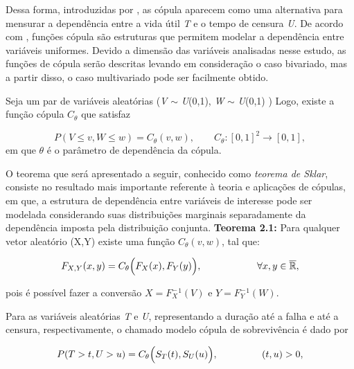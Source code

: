 \documentclass[11pt, a4paper]{article}
\begin{document}
\vspace{0,2cm}
Dessa forma, introduzidas por , as cópula aparecem como uma alternativa para mensurar a dependência entre a vida útil \textit{T} e o tempo de censura \textit{U}. De acordo com , funções cópula são estruturas que permitem modelar a dependência entre variáveis uniformes. Devido a dimensão das variáveis analisadas nesse estudo, as funções de cópula serão
descritas levando em consideração o caso bivariado, mas a partir disso, o caso multivariado pode ser facilmente obtido.

Seja um par de variáveis aleatórias \Big(\textit{V} $\sim$ \textit{U}(0,1),  \textit{W} $\sim$ \textit{U}(0,1) \Big) Logo, existe a função cópula $C_{\theta}$ que satisfaz

\begin{equation*}
P(V \le v, W \le w) = C_{\theta}(v,w),\quad\quad C_{\theta} : [0,1]^2 \rightarrow [0,1],
\end{equation*}
em que $\theta$ é o parâmetro de dependência da cópula.


O teorema que será apresentado a seguir, conhecido como \textit{teorema de Sklar}, consiste no resultado mais importante referente à teoria e aplicações de cópulas, em que, a estrutura de dependência entre variáveis de interesse pode ser modelada considerando suas distribuições marginais separadamente da dependência imposta pela distribuição conjunta.
\newpage
\noindent\textbf{Teorema 2.1:} Para qualquer vetor aleatório (X,Y) existe uma função $C_{\theta}(v,w)$, tal que:



\begin{equation*}
F_{X,Y}(x,y)=C_{\theta} \Big( F_{X}(x), F_{Y}(y) \Big), \hspace{20mm} \forall x,y \in\overline{\mathbb{R}},
\end{equation*}

\noindent pois é possível fazer a conversão $X = F_X^{-}^{1}(V)$ e $Y = F_Y^{-}^{1}(W)$.

Para as variáveis aleatórias \textit{T} e \textit{U}, representando a duração até a falha e até a censura,
respectivamente, o chamado modelo cópula de sobrevivência é dado por

\begin{equation*}
P(T > t,U > u) = C_\theta\Big(S_T(t), S_U(u)\Big),\hspace{16mm}(t, u) > 0,
\end{equation*}
\end{document}

